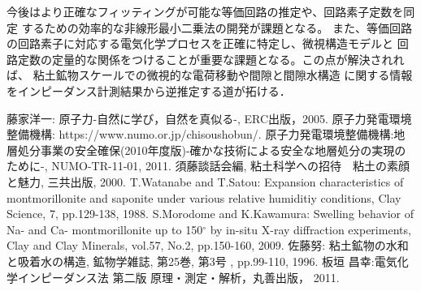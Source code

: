 ﻿\documentclass[11pt,a4j]{mybook2}
\begin{document}
今後はより正確なフィッティングが可能な等価回路の推定や、回路素子定数を同定
するための効率的な非線形最小二乗法の開発が課題となる。
また、等価回路の回路素子に対応する電気化学プロセスを正確に特定し、微視構造モデルと
回路定数の定量的な関係をつけることが重要な課題となる。この点が解決されれば、
粘土鉱物スケールでの微視的な電荷移動や間隙と間隙水構造
に関する情報をインピーダンス計測結果から逆推定する道が拓ける．
\renewcommand{\bibname}{参考文献}
\begin{thebibliography}{99}
	藤家洋一: 原子力-自然に学び，自然を真似る-, ERC出版，2005.
	原子力発電環境整備機構: https://www.numo.or.jp/chisoushobun/.
	原子力発電環境整備機構:地層処分事業の安全確保(2010年度版)-確かな技術による安全な地層処分の実現のために-, NUMO-TR-11-01, 2011.
	須藤談話会編, 粘土科学への招待　粘土の素顔と魅力, 三共出版, 2000.
	T.Watanabe and T.Satou: Expansion characteristics of montmorillonite and saponite under various 
	relative humiditiy conditions, Clay Science, 7, pp.129-138, 1988.
	S.Morodome and K.Kawamura: Swelling behavior of Na- and Ca- montmorillonite up to 150$^\circ$ by in-situ 
	X-ray diffraction experiments, Clay and Clay Minerals, vol.57, No.2, pp.150-160, 2009.
	佐藤努: 粘土鉱物の水和と吸着水の構造, 鉱物学雑誌, 第25巻, 第3号 , pp.99-110, 1996.
	板垣 昌幸:電気化学インピーダンス法 第二版 原理・測定・解析，丸善出版， 2011. 
\end{thebibliography}
\end{document}
